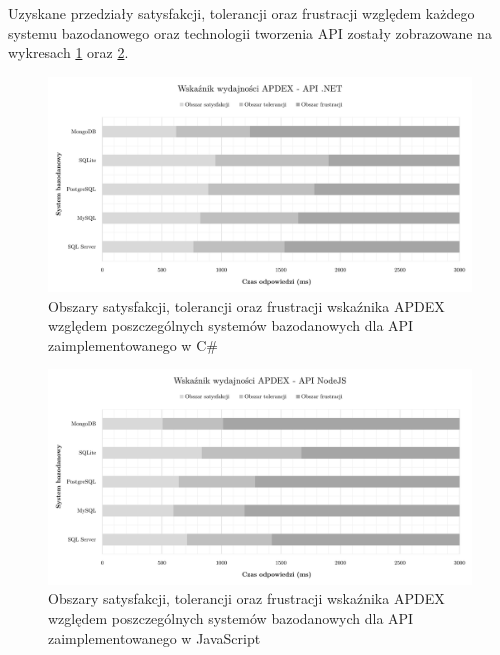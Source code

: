 Uzyskane przedziały satysfakcji, tolerancji oraz frustracji względem każdego systemu bazodanowego oraz technologii tworzenia API zostały zobrazowane na wykresach \ref{fig:apdex-dotnet} oraz \ref{fig:apdex-nodejs}.

\begin{figure}[ht]
    \centering
     \includegraphics[width=\linewidth]{rys05/apdex-dotnet.pdf}
    \caption{Obszary satysfakcji, tolerancji oraz frustracji wskaźnika APDEX względem poszczególnych systemów bazodanowych dla API zaimplementowanego w C\#}
    \label{fig:apdex-dotnet}
\end{figure}

\begin{figure}[ht]
    \centering
     \includegraphics[width=\linewidth]{rys05/apdex-nodejs.pdf}
    \caption{Obszary satysfakcji, tolerancji oraz frustracji wskaźnika APDEX względem poszczególnych systemów bazodanowych dla API zaimplementowanego w JavaScript}
    \label{fig:apdex-nodejs}
\end{figure}


